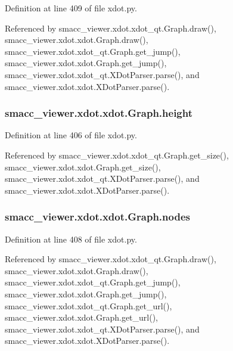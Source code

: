 Definition at line 409 of file xdot.\+py.



Referenced by smacc\+\_\+viewer.\+xdot.\+xdot\+\_\+qt.\+Graph.\+draw(), smacc\+\_\+viewer.\+xdot.\+xdot.\+Graph.\+draw(), smacc\+\_\+viewer.\+xdot.\+xdot\+\_\+qt.\+Graph.\+get\+\_\+jump(), smacc\+\_\+viewer.\+xdot.\+xdot.\+Graph.\+get\+\_\+jump(), smacc\+\_\+viewer.\+xdot.\+xdot\+\_\+qt.\+X\+Dot\+Parser.\+parse(), and smacc\+\_\+viewer.\+xdot.\+xdot.\+X\+Dot\+Parser.\+parse().

\subsubsection[{\texorpdfstring{height}{height}}]{\setlength{\rightskip}{0pt plus 5cm}smacc\+\_\+viewer.\+xdot.\+xdot.\+Graph.\+height}\hypertarget{classsmacc__viewer_1_1xdot_1_1xdot_1_1Graph_a6cb6db75d4f5a5696f69f34c6b500f34}{}\label{classsmacc__viewer_1_1xdot_1_1xdot_1_1Graph_a6cb6db75d4f5a5696f69f34c6b500f34}


Definition at line 406 of file xdot.\+py.



Referenced by smacc\+\_\+viewer.\+xdot.\+xdot\+\_\+qt.\+Graph.\+get\+\_\+size(), smacc\+\_\+viewer.\+xdot.\+xdot.\+Graph.\+get\+\_\+size(), smacc\+\_\+viewer.\+xdot.\+xdot\+\_\+qt.\+X\+Dot\+Parser.\+parse(), and smacc\+\_\+viewer.\+xdot.\+xdot.\+X\+Dot\+Parser.\+parse().

\subsubsection[{\texorpdfstring{nodes}{nodes}}]{\setlength{\rightskip}{0pt plus 5cm}smacc\+\_\+viewer.\+xdot.\+xdot.\+Graph.\+nodes}\hypertarget{classsmacc__viewer_1_1xdot_1_1xdot_1_1Graph_afcc48b27e46e8e0ddd98a35d5de99d16}{}\label{classsmacc__viewer_1_1xdot_1_1xdot_1_1Graph_afcc48b27e46e8e0ddd98a35d5de99d16}


Definition at line 408 of file xdot.\+py.



Referenced by smacc\+\_\+viewer.\+xdot.\+xdot\+\_\+qt.\+Graph.\+draw(), smacc\+\_\+viewer.\+xdot.\+xdot.\+Graph.\+draw(), smacc\+\_\+viewer.\+xdot.\+xdot\+\_\+qt.\+Graph.\+get\+\_\+jump(), smacc\+\_\+viewer.\+xdot.\+xdot.\+Graph.\+get\+\_\+jump(), smacc\+\_\+viewer.\+xdot.\+xdot\+\_\+qt.\+Graph.\+get\+\_\+url(), smacc\+\_\+viewer.\+xdot.\+xdot.\+Graph.\+get\+\_\+url(), smacc\+\_\+viewer.\+xdot.\+xdot\+\_\+qt.\+X\+Dot\+Parser.\+parse(), and smacc\+\_\+viewer.\+xdot.\+xdot.\+X\+Dot\+Parser.\+parse().

